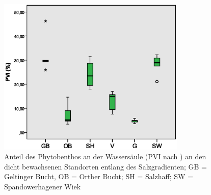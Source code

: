 \begin{figure}[htb]
\centering
\includegraphics[width=0.80\textwidth]{images/pvi/pvi_salzgradient.eps}
\caption[PVI an Standorten entlang des Salzgradienten]{Anteil des Phytobenthos an der Wassersäule (PVI nach \cite{jeppesen_1998}) an den dicht bewachsenen Standorten entlang des Salzgradienten; GB = Geltinger Bucht, OB = Orther Bucht; SH = Salzhaff; SW = Spandowerhagener Wiek}
\label{fig:pvi_salzgradient}
\end{figure}



